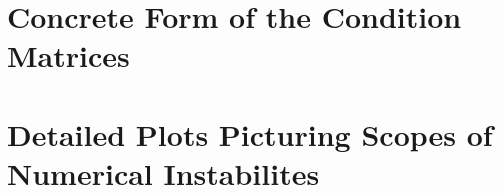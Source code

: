 \section{Concrete Form of the Condition Matrices}


\section{Detailed Plots Picturing Scopes of Numerical Instabilites}